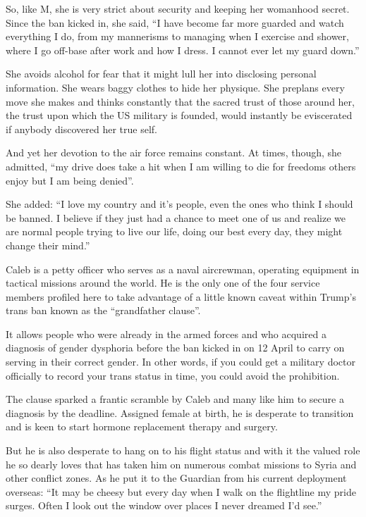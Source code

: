 So, like M, she is very strict about security and keeping her womanhood secret. Since the ban kicked in, she said, “I have become far more guarded and watch everything I do, from my mannerisms to managing when I exercise and shower, where I go off-base after work and how I dress. I cannot ever let my guard down.”

She avoids alcohol for fear that it might lull her into disclosing personal information. She wears baggy clothes to hide her physique. She preplans every move she makes and thinks constantly that the sacred trust of those around her, the trust upon which the US military is founded, would instantly be eviscerated if anybody discovered her true self.

And yet her devotion to the air force remains constant. At times, though, she admitted, “my drive does take a hit when I am willing to die for freedoms others enjoy but I am being denied”.

She added: “I love my country and it’s people, even the ones who think I should be banned. I believe if they just had a chance to meet one of us and realize we are normal people trying to live our life, doing our best every day, they might change their mind.”

Caleb is a petty officer who serves as a naval aircrewman, operating equipment in tactical missions around the world. He is the only one of the four service members profiled here to take advantage of a little known caveat within Trump’s trans ban known as the “grandfather clause”.

It allows people who were already in the armed forces and who acquired a diagnosis of gender dysphoria before the ban kicked in on 12 April to carry on serving in their correct gender. In other words, if you could get a military doctor officially to record your trans status in time, you could avoid the prohibition.

The clause sparked a frantic scramble by Caleb and many like him to secure a diagnosis by the deadline. Assigned female at birth, he is desperate to transition and is keen to start hormone replacement therapy and surgery.

But he is also desperate to hang on to his flight status and with it the valued role he so dearly loves that has taken him on numerous combat missions to Syria and other conflict zones. As he put it to the Guardian from his current deployment overseas: “It may be cheesy but every day when I walk on the flightline my pride surges. Often I look out the window over places I never dreamed I’d see.”


